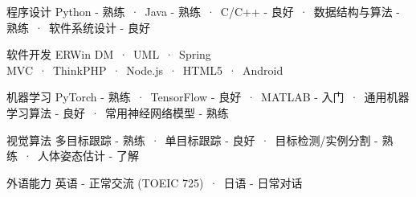 

\begin{cvskills}
  \cvskill
    {程序设计} %
    {Python - 熟练\ ·\ Java - 熟练\ ·\ C/C++ - 良好\ ·\ 数据结构与算法 - 熟练\ ·\ 软件系统设计 - 良好} %
    
  \cvskill
    {软件开发} %
    {ERWin DM\ ·\ UML\ ·\ Spring MVC\ ·\ ThinkPHP\ ·\ Node.js\ ·\ HTML5\ ·\ Android} %

  \cvskill
    {机器学习} %
    {PyTorch - 熟练\ ·\ TensorFlow - 良好\ ·\ MATLAB - 入门\ ·\ 通用机器学习算法 - 良好\ ·\ 常用神经网络模型 - 熟练} %
    
  \cvskill
    {视觉算法} %
    {多目标跟踪 - 熟练\ ·\ 单目标跟踪 - 良好\ ·\ 目标检测/实例分割 - 熟练\ ·\ 人体姿态估计 - 了解} %
    
  \cvskill
    {外语能力} %
    {英语 - 正常交流 (TOEIC 725)\ ·\ 日语 - 日常对话} %
    

\end{cvskills}